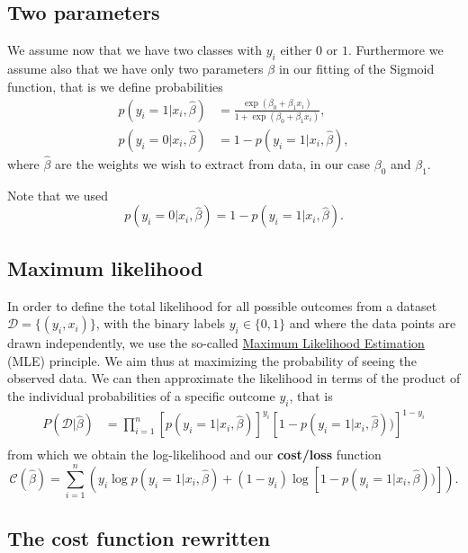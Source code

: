 \documentclass[%
oneside,                 %
final,                   %
10pt]{article}
\begin{document}
\subsection*{Two parameters}

We assume now that we have two classes with $y_i$ either $0$ or $1$. Furthermore we assume also that we have only two parameters $\beta$ in our fitting of the Sigmoid function, that is we define probabilities 
\begin{align*}
p(y_i=1|x_i,\hat{\beta}) &= \frac{\exp{(\beta_0+\beta_1x_i)}}{1+\exp{(\beta_0+\beta_1x_i)}},\nonumber\\
p(y_i=0|x_i,\hat{\beta}) &= 1 - p(y_i=1|x_i,\hat{\beta}),
\end{align*}
where $\hat{\beta}$ are the weights we wish to extract from data, in our case $\beta_0$ and $\beta_1$. 

Note that we used
\[
p(y_i=0\vert x_i, \hat{\beta}) = 1-p(y_i=1\vert x_i, \hat{\beta}).
\]

\subsection*{Maximum likelihood}

In order to define the total likelihood for all possible outcomes from a  
dataset $\mathcal{D}=\{(y_i,x_i)\}$, with the binary labels
$y_i\in\{0,1\}$ and where the data points are drawn independently, we use the so-called \href{{https://en.wikipedia.org/wiki/Maximum_likelihood_estimation}}{Maximum Likelihood Estimation} (MLE) principle. 
We aim thus at maximizing 
the probability of seeing the observed data. We can then approximate the 
likelihood in terms of the product of the individual probabilities of a specific outcome $y_i$, that is 
\begin{align*}
P(\mathcal{D}|\hat{\beta})& = \prod_{i=1}^n \left[p(y_i=1|x_i,\hat{\beta})\right]^{y_i}\left[1-p(y_i=1|x_i,\hat{\beta}))\right]^{1-y_i}\nonumber \\
\end{align*}
from which we obtain the log-likelihood and our \textbf{cost/loss} function
\[
\mathcal{C}(\hat{\beta}) = \sum_{i=1}^n \left( y_i\log{p(y_i=1|x_i,\hat{\beta})} + (1-y_i)\log\left[1-p(y_i=1|x_i,\hat{\beta}))\right]\right).
\]

\subsection*{The cost function rewritten}
\end{document}
